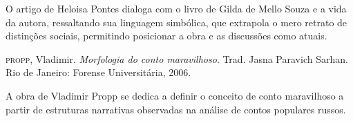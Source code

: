 \documentclass[12pt]{extarticle}
\begin{document}
O artigo de Heloisa Pontes dialoga com o livro de Gilda de Mello Souza e  
a vida da autora, ressaltando sua linguagem simbólica, que extrapola 
o mero retrato de distinções sociais, permitindo posicionar a obra e as discussões 
como atuais. 

\textsc{propp}, Vladimir. \emph{Morfologia do conto maravilhoso}. Trad. Jasna
Paravich Sarhan. Rio de Janeiro: Forense Universitária, 2006. 

A obra de Vladimir Propp se dedica a definir o conceito de conto maravilhoso
a partir de estruturas narrativas observadas na análise de contos
populares russos.
\end{document}
